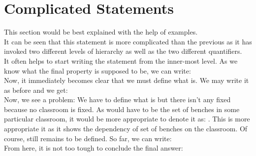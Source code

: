 \section{Complicated Statements}\label{sec:compstate}
This section would be best explained with the help of examples.
\\
It can be seen that this statement is more complicated than the previous as it has invoked two different levels of hierarchy as well as the two different quantifiers.\\
It often helps to start writing the statement from the inner-most level. As we know what the final property is supposed to be, we can write: {\color{examplecolor}{(b is brown.)}}\\
Now, it immediately becomes clear that we must define what {\color{examplecolor}{b}} is. We may write it as before and we get: {\color{examplecolor}{$\forall b \in B$(b is brown.)}}\\
Now, we see a problem: We have to define what {\color{examplecolor}{B}} is but there isn't any fixed {\color{examplecolor}{B}} because no classroom is fixed. As {\color{examplecolor}{B}} would have to be the set of benches in some particular classroom, it would be more appropriate to denote it as: {\color{examplecolor}{$B_c$}}. This is more appropriate it as it shows the dependency of set of benches on the classroom. Of course,  {\color{examplecolor}{c}} still remains to be defined. So far, we can write: {\color{examplecolor}{$\bigg(\forall b \in B_c$(b is brown.)\bigg)}}\\
From here, it is not too tough to conclude the final answer:
\addtocounter{example}{-1}
\\~\\
